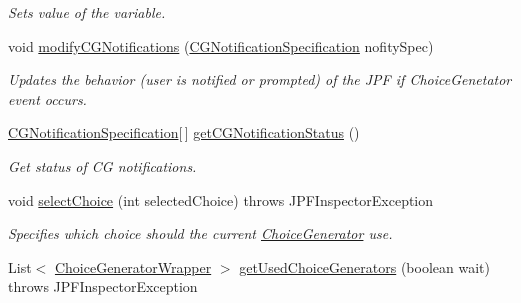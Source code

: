 \begin{DoxyCompactItemize}
\begin{DoxyCompactList}\small\item\em Sets value of the variable. \end{DoxyCompactList}\item 
void \hyperlink{interfacegov_1_1nasa_1_1jpf_1_1inspector_1_1interfaces_1_1_choice_generators_interface_a7c85aa8be525bc12e0fcacfbdb7e3094}{modify\+C\+G\+Notifications} (\hyperlink{classgov_1_1nasa_1_1jpf_1_1inspector_1_1interfaces_1_1_choice_generators_interface_1_1_c_g_notification_specification}{C\+G\+Notification\+Specification} nofity\+Spec)
\begin{DoxyCompactList}\small\item\em Updates the behavior (user is notified or prompted) of the J\+PF if Choice\+Genetator event occurs. \end{DoxyCompactList}\item 
\hyperlink{classgov_1_1nasa_1_1jpf_1_1inspector_1_1interfaces_1_1_choice_generators_interface_1_1_c_g_notification_specification}{C\+G\+Notification\+Specification}\mbox{[}$\,$\mbox{]} \hyperlink{interfacegov_1_1nasa_1_1jpf_1_1inspector_1_1interfaces_1_1_choice_generators_interface_a50be99532b75699fd9b5b24b38bd27ca}{get\+C\+G\+Notification\+Status} ()
\begin{DoxyCompactList}\small\item\em Get status of CG notifications. \end{DoxyCompactList}\item 
void \hyperlink{interfacegov_1_1nasa_1_1jpf_1_1inspector_1_1interfaces_1_1_choice_generators_interface_a055b8d48f863633614dee147bc607ed7}{select\+Choice} (int selected\+Choice)  throws J\+P\+F\+Inspector\+Exception
\begin{DoxyCompactList}\small\item\em Specifies which choice should the current \hyperlink{}{Choice\+Generator} use. \end{DoxyCompactList}\item 
List$<$ \hyperlink{classgov_1_1nasa_1_1jpf_1_1inspector_1_1utils_1_1_choice_generator_wrapper}{Choice\+Generator\+Wrapper} $>$ \hyperlink{interfacegov_1_1nasa_1_1jpf_1_1inspector_1_1interfaces_1_1_choice_generators_interface_aba03345fdef7f19fdebe45ff7f873297}{get\+Used\+Choice\+Generators} (boolean wait)  throws J\+P\+F\+Inspector\+Exception
\end{DoxyCompactItemize}
